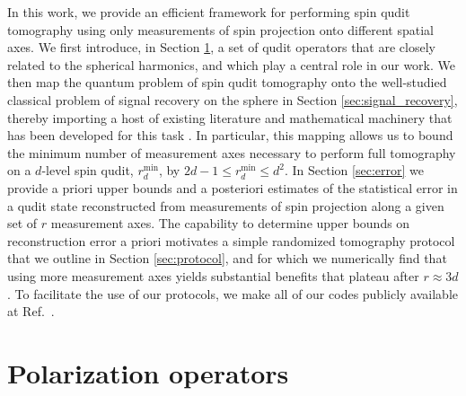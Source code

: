 \documentclass[a4paper,twocolumn,unpublished]{quantumarticle}
\renewcommand{\t}{\text} %
\begin{document}
In this work, we provide an efficient framework for performing spin qudit tomography using only measurements of spin projection onto different spatial axes.
We first introduce, in Section \ref{sec:polarization_ops}, a set of qudit operators that are closely related to the spherical harmonics, and which play a central role in our work.
We then map the quantum problem of spin qudit tomography onto the well-studied classical problem of signal recovery on the sphere in Section \ref{sec:signal_recovery}, thereby importing a host of existing literature and mathematical machinery that has been developed for this task \cite{mcewen2011novel, rauhut2011sparse, alem2012sparse, khalid2014optimaldimensionality}.
In particular, this mapping allows us to bound the minimum number of measurement axes necessary to perform full tomography on a $d$-level spin qudit, $r_d^{\t{min}}$, by $2d-1\le r_d^{\t{min}}\le d^2$.
In Section \ref{sec:error} we provide a priori upper bounds and a posteriori estimates of the statistical error in a qudit state reconstructed from measurements of spin projection along a given set of $r$ measurement axes.
The capability to determine upper bounds on reconstruction error a priori motivates a simple randomized tomography protocol that we outline in Section \ref{sec:protocol}, and for which we numerically find that using more measurement axes yields substantial benefits that plateau after $r\approx3d$.
To facilitate the use of our protocols, we make all of our codes publicly available at Ref.~\cite{codes}.


\section{Polarization operators}
\label{sec:polarization_ops}
\end{document}
